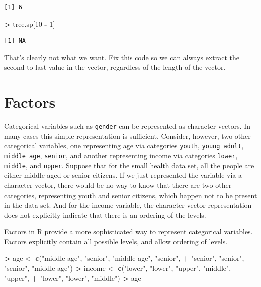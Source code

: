 \documentclass[]{krantz}
\makeatletter
\newenvironment{Shaded}{\begin{snugshade}}{\end{snugshade}}
\newcommand{\KeywordTok}[1]{\textcolor[rgb]{0.27,0.27,0.27}{\textbf{#1}}}
\newcommand{\DecValTok}[1]{\textcolor[rgb]{0.06,0.06,0.06}{#1}}
\newcommand{\StringTok}[1]{\textcolor[rgb]{0.5,0.5,0.5}{#1}}
\newcommand{\OperatorTok}[1]{\textcolor[rgb]{0.43,0.43,0.43}{\textbf{#1}}}
\newcommand{\NormalTok}[1]{#1}
\newenvironment{kframe}{%
\medskip{}
\setlength{\fboxsep}{.8em}
 \def\at@end@of@kframe{}%
 \ifinner\ifhmode%
  \def\at@end@of@kframe{\end{minipage}}%
  \begin{minipage}{\columnwidth}%
 \fi\fi%
 \def\FrameCommand##1{\hskip\@totalleftmargin \hskip-\fboxsep
 \colorbox{shadecolor}{##1}\hskip-\fboxsep
     \hskip-\linewidth \hskip-\@totalleftmargin \hskip\columnwidth}%
 \MakeFramed {\advance\hsize-\width
   \@totalleftmargin\z@ \linewidth\hsize
   \@setminipage}}%
 {\par\unskip\endMakeFramed%
 \at@end@of@kframe}
\renewenvironment{Shaded}{\begin{kframe}}{\end{kframe}}
\makeatother
\begin{document}
\begin{verbatim}
[1] 6
\end{verbatim}

\begin{Shaded}
\begin{Highlighting}[]
\OperatorTok{>}\StringTok{ }\NormalTok{tree.sp[}\DecValTok{10} \OperatorTok{-}\StringTok{ }\DecValTok{1}\NormalTok{]}
\end{Highlighting}
\end{Shaded}

\begin{verbatim}
[1] NA
\end{verbatim}

That's clearly not what we want. Fix this code so we can always extract
the second to last value in the vector, regardless of the length of the
vector.

\section{Factors}\label{factors}

Categorical variables such as \texttt{gender} can be represented as
character vectors. In many cases this simple representation is
sufficient. Consider, however, two other categorical variables, one
representing age via categories \texttt{youth}, \texttt{young\ adult},
\texttt{middle\ age}, \texttt{senior}, and another representing income
via categories \texttt{lower}, \texttt{middle}, and \texttt{upper}.
Suppose that for the small health data set, all the people are either
middle aged or senior citizens. If we just represented the variable via
a character vector, there would be no way to know that there are two
other categories, representing youth and senior citizens, which happen
not to be present in the data set. And for the income variable, the
character vector representation does not explicitly indicate that there
is an ordering of the levels.

Factors in R provide a more sophisticated way to represent categorical
variables. Factors explicitly contain all possible levels, and allow
ordering of levels.

\begin{Shaded}
\begin{Highlighting}[]
\OperatorTok{>}\StringTok{ }\NormalTok{age <-}\StringTok{ }\KeywordTok{c}\NormalTok{(}\StringTok{"middle age"}\NormalTok{, }\StringTok{"senior"}\NormalTok{, }\StringTok{"middle age"}\NormalTok{, }\StringTok{"senior"}\NormalTok{,}
\OperatorTok{+}\StringTok{          "senior"}\NormalTok{, }\StringTok{"senior"}\NormalTok{, }\StringTok{"senior"}\NormalTok{, }\StringTok{"middle age"}\NormalTok{)}
\OperatorTok{>}\StringTok{ }\NormalTok{income <-}\StringTok{ }\KeywordTok{c}\NormalTok{(}\StringTok{"lower"}\NormalTok{, }\StringTok{"lower"}\NormalTok{, }\StringTok{"upper"}\NormalTok{, }\StringTok{"middle"}\NormalTok{, }\StringTok{"upper"}\NormalTok{,}
\OperatorTok{+}\StringTok{             "lower"}\NormalTok{, }\StringTok{"lower"}\NormalTok{, }\StringTok{"middle"}\NormalTok{)}
\OperatorTok{>}\StringTok{ }\NormalTok{age}
\end{Highlighting}
\end{Shaded}
\end{document}
